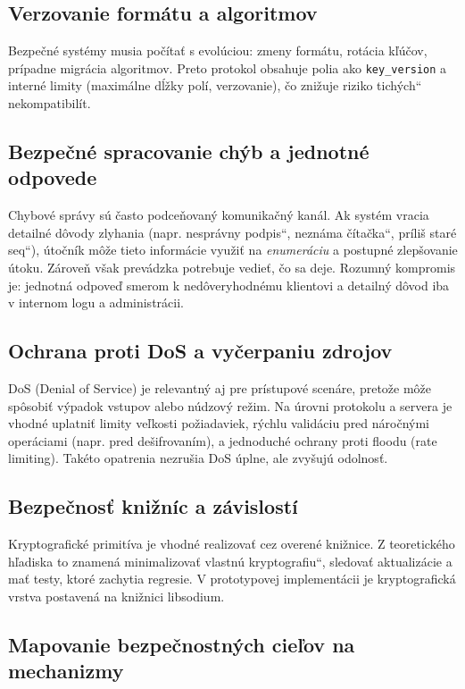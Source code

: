 \documentclass[journal,a4paper,onecolumn]{IEEEtran}
\newcommand{\uv}[1]{\quotedblbase#1\textquotedblleft}
\begin{document}
\subsection{Verzovanie formátu a algoritmov}

Bezpečné systémy musia počítať s evolúciou: zmeny formátu, rotácia kľúčov, prípadne migrácia algoritmov. Preto protokol obsahuje polia ako \texttt{key\_version} a interné limity (maximálne dĺžky polí, verzovanie), čo znižuje riziko \uv{tichých} nekompatibilít.


\subsection{Bezpečné spracovanie chýb a jednotné odpovede}

Chybové správy sú často podceňovaný komunikačný kanál. Ak systém vracia detailné dôvody zlyhania (napr. \uv{nesprávny podpis}, \uv{neznáma čítačka}, \uv{príliš staré seq}), útočník môže tieto informácie využiť na \emph{enumeráciu} a postupné zlepšovanie útoku. Zároveň však prevádzka potrebuje vedieť, čo sa deje. Rozumný kompromis je: jednotná odpoveď smerom k nedôveryhodnému klientovi a detailný dôvod iba v internom logu a administrácii.

\subsection{Ochrana proti DoS a vyčerpaniu zdrojov}

DoS (Denial of Service) je relevantný aj pre prístupové scenáre, pretože môže spôsobiť výpadok vstupov alebo núdzový režim. Na úrovni protokolu a servera je vhodné uplatniť limity veľkosti požiadaviek, rýchlu validáciu pred náročnými operáciami (napr. pred dešifrovaním), a jednoduché ochrany proti floodu (rate limiting). Takéto opatrenia nezrušia DoS úplne, ale zvyšujú odolnosť.

\subsection{Bezpečnosť knižníc a závislostí}

Kryptografické primitíva je vhodné realizovať cez overené knižnice. Z teoretického hľadiska to znamená minimalizovať \uv{vlastnú kryptografiu}, sledovať aktualizácie a mať testy, ktoré zachytia regresie. V prototypovej implementácii je kryptografická vrstva postavená na knižnici libsodium.\cite{LibsodiumXChaChaDoc}

\subsection{Mapovanie bezpečnostných cieľov na mechanizmy}
\end{document}
